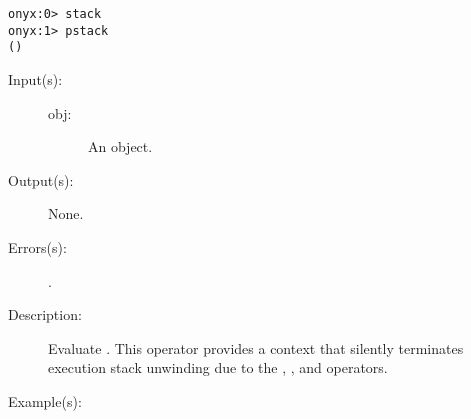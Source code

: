 \begin{description}
\begin{description}
\begin{verbatim}
onyx:0> stack
onyx:1> pstack
()
		\end{verbatim}
	\end{description}
\label{systemdict:start}
\item[{\onyxop{obj}{start}{--}}: ]
	\begin{description}\item[]
	\item[Input(s): ]
		\begin{description}\item[]
		\item[obj: ]
			An object.
		\end{description}
	\item[Output(s): ] None.
	\item[Errors(s): ]
		\begin{description}\item[]
		\item[.]
		\end{description}
	\item[Description: ]
		Evaluate .  This operator provides a context that
		silently terminates execution stack unwinding due to the
		,
		, and
		 operators.
	\item[Example(s): ]\begin{verbatim}


\end{verbatim}
\end{description}
\end{description}
